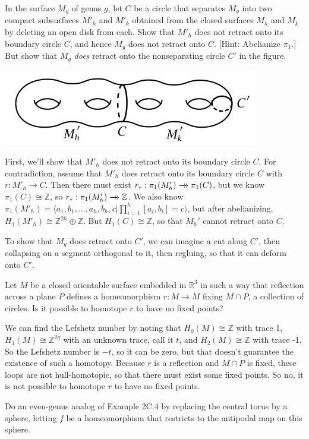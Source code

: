 \documentclass[12pt]{article}
\newcommand{\Z}{\mathbb{Z}}
\newcommand{\doublearrow}[1]{\xrightarrow[]{#1}\mathrel{\mkern-14mu}\rightarrow}
\begin{document}
\begin{statement}[1.2.9]
    In the surface $M_g$ of genus $g$, let $C$ be a circle that separates $M_g$ into two compact subsurfaces $M'_h$ and $M'_k$ obtained from the closed surfaces $M_h$ and $M_k$ by deleting an open disk from each. Show that $M'_h$ does not retract onto its boundary circle $C$, and hence $M_g$ does not retract onto $C$. [Hint: Abelianize $\pi_1$.] But show that $M_g$ \emph{does} retract onto the nonseparating circle $C'$ in the figure.
  \begin{center} \includegraphics[scale=.8]{5.1.png} \end{center}
\end{statement}
\begin{newproof}
    First, we'll show that $M'_h$ does not retract onto its boundary circle $C$. For contradiction, assume that $M'_h$ does retract onto its boundary circle $C$ with $r: M'_h \to C$. Then there must exist $r_*:\pi_1(M'_h) \doublearrow{} \pi_1(C)$, but we know $\pi_1(C) \cong \Z$, so $r_*:\pi_1(M'_h) \doublearrow{} \Z$. We also know $\pi_1(M'_h)= \langle a_1,b_1, \dots, a_h, b_h, c \vert \prod_{i=1}^{h} [a_i, b_i]=c \rangle$, but after abelianizing, $H_1(M'_h) \cong \Z^{2h} \oplus \Z$. But $H_1(C) \cong \Z$, so that $M_h'$ cannot retract onto $C$.
    \par To show that $M_g$ does retract onto $C'$, we can imagine a cut along $C'$, then collapsing on a segment orthogonal to it, then regluing, so that it can deform onto $C'$. 
\end{newproof}

\begin{statement}[2.C.5]
    Let $M$ be a closed orientable surface embedded in $\mathbb{R}^3$ in such a way that reflection across a plane $P$ defines a homeomorphism $r : M \to M$ fixing $M \cap P$, a collection of circles. Is it possible to homotope $r$ to have no fixed points?
\end{statement}
\begin{newproof}
    We can find the Lefshetz number by noting that $H_0(M) \cong \Z$ with trace 1, $H_1(M) \cong \Z^{2g}$ with an unknown trace, call it $t$, and $H_2(M) \cong \Z$ with trace -1. So the Lefshetz number is $-t$, so it can be zero, but that doesn't guarantee the existence of such a homotopy. Because $r$ is a reflection and $M \cap P$ is fixed, these loops are not hull-homotopic, so that there must exist some fixed points. So no, it is not possible to homotope $r$ to have no fixed points. 
\end{newproof}

\begin{statement}[2.C.6]
    Do an even-genus analog of Example 2C.4 by replacing the central torus by a sphere, letting $f$ be a homeomorphism that restricts to the antipodal map on this sphere. 
\end{statement}
\end{document}
